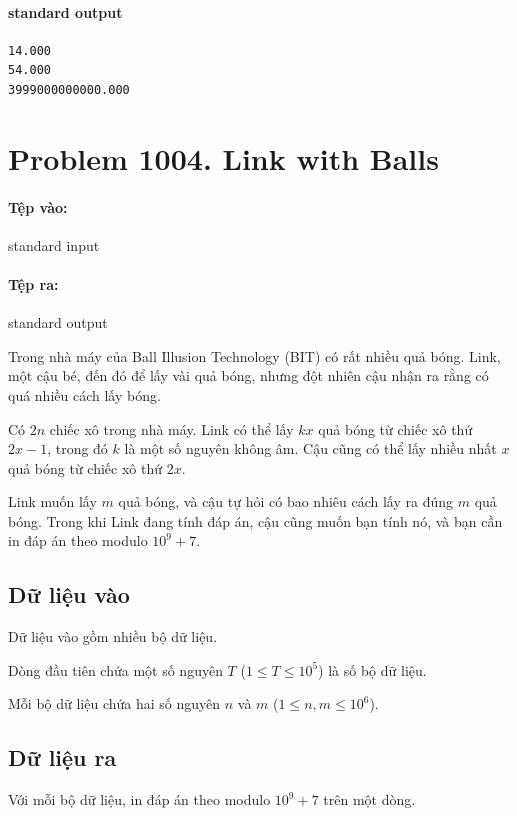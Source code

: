\documentclass[11pt]{article}
\begin{document}
\paragraph{standard output}
\begin{verbatim}
14.000
54.000
3999000000000.000
\end{verbatim}

\section{Problem 1004. Link with Balls}

\paragraph{Tệp vào:} standard input
\paragraph{Tệp ra:} standard output

Trong nhà máy của Ball Illusion Technology (BIT) có rất nhiều quả bóng. Link,
một cậu bé, đến đó để lấy vài quả bóng, nhưng đột nhiên cậu nhận ra rằng có
quá nhiều cách lấy bóng.

Có \(2n\) chiếc xô trong nhà máy. Link có thể lấy \(kx\) quả bóng từ chiếc xô
thứ \(2x-1\), trong đó \(k\) là một số nguyên không âm. Cậu cũng có thể lấy
nhiều nhất \(x\) quả bóng từ chiếc xô thứ \(2x\).

Link muốn lấy \(m\) quả bóng, và cậu tự hỏi có bao nhiêu cách lấy ra đúng
\(m\) quả bóng. Trong khi Link đang tính đáp án, cậu cũng muốn bạn tính nó, và
bạn cần in đáp án theo modulo \(10^9+7\).

\subsection*{Dữ liệu vào}

Dữ liệu vào gồm nhiều bộ dữ liệu.

Dòng đầu tiên chứa một số nguyên \(T\) (\(1\le T\le 10^5\)) là số bộ dữ liệu.

Mỗi bộ dữ liệu chứa hai số nguyên \(n\) và \(m\)
(\(1\le n,m\le 10^6\)).

\subsection*{Dữ liệu ra}

Với mỗi bộ dữ liệu, in đáp án theo modulo \(10^9+7\) trên một dòng.
\end{document}
